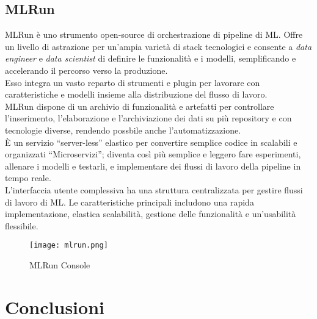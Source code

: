 \documentclass[../tesi.tex]{subfiles}
\begin{document}
\subsection{MLRun}
  MLRun è uno strumento open-source di orchestrazione di \Gls{pipeline} di ML. Offre un livello di astrazione per un'ampia varietà di stack tecnologici e consente a \textit{data engineer} e \textit{data scientist} di definire le funzionalità e i modelli, semplificando e accelerando il percorso verso la produzione.\\
  Esso integra un vasto reparto di strumenti e plugin per lavorare con caratteristiche e modelli insieme alla distribuzione del flusso di lavoro.\\
  MLRun dispone di un archivio di funzionalità e artefatti per controllare l’inserimento, l’elaborazione e l’archiviazione dei dati su più repository e con tecnologie diverse, rendendo possbile anche l'automatizzazione.\\
  È un servizio ``\Gls{server-less}''  elastico per convertire semplice codice in scalabili e organizzati ``\Gls{Microservizi}''; diventa così più semplice e leggero fare esperimenti, allenare i modelli e testarli, e implementare dei flussi di lavoro della \Gls{pipeline} in tempo reale.\\
  L’interfaccia utente complessiva ha una struttura centralizzata per gestire flussi di lavoro di ML. Le caratteristiche principali includono una rapida implementazione, elastica scalabilità, gestione delle funzionalità e un'usabilità flessibile.\cite{mlrunframework}\\
  \begin{figure}[htbp]
    \centering
    \texttt{[image: mlrun.png]} 
    \caption{MLRun Console}
    \end{figure}

\section{Conclusioni}
\end{document}
